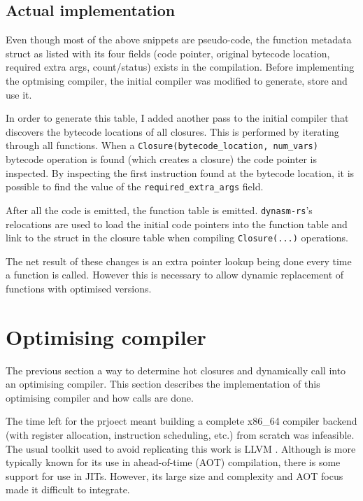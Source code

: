 \subsection{Actual implementation}

Even though most of the above snippets are pseudo-code, the function metadata struct as listed with
its four fields (code pointer, original bytecode location, required extra args, count/status)
exists in the compilation. Before implementing the optmising compiler, the initial compiler was
modified to generate, store and use it.

In order to generate this table, I added another pass to the initial compiler that discovers the
bytecode locations of all closures. This is performed by iterating through all functions. When a
\texttt{Closure(bytecode\_location, num\_vars)} bytecode operation is found (which creates a
closure) the code pointer is inspected. By inspecting the first instruction found at the bytecode
location, it is possible to find the value of the \texttt{required\_extra\_args} field.

After all the code is emitted, the function table is emitted. \texttt{dynasm-rs}'s relocations are
used to load the initial code pointers into the function table and link to the struct in the
closure table when compiling \texttt{Closure(...)} operations.

The net result of these changes is an extra pointer lookup being done every time a function is
called. However this is necessary to allow dynamic replacement of functions with optimised
versions.

\section{Optimising compiler} \label{opt-comp}

The previous section a way to determine hot closures and dynamically call
into an optimising compiler. This section describes the implementation of this optimising compiler
and how calls are done.

The time left for the prjoect meant building a complete x86\_64 compiler backend (with register
allocation,
instruction scheduling, etc.) from scratch was infeasible. The usual toolkit used to avoid
replicating this work is LLVM \cite{llvm}. Although is more typically known for its use in
ahead-of-time (AOT) compilation, there is some support for use in JITs. However, its large size and
complexity and AOT focus made it difficult to integrate.

